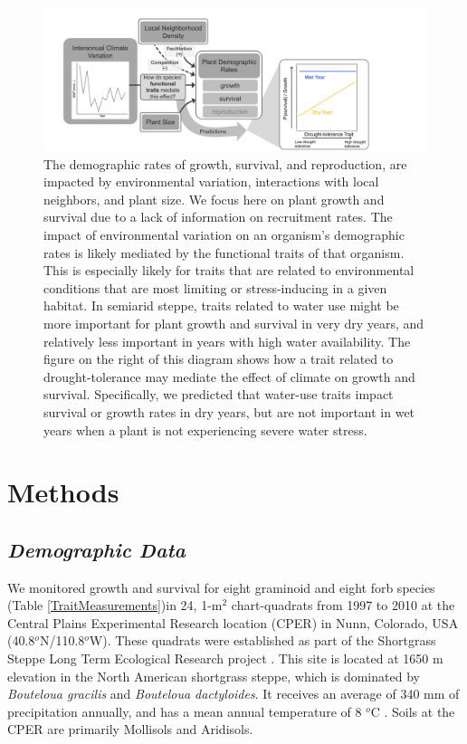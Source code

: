 \documentclass[12pt, letterpaper]{article}
\begin{document}
\begin{figure}
\includegraphics[width=1\textwidth]{CO_sgs_ConceptualFigure.pdf}
\caption{\small{
The demographic rates of growth, survival, and reproduction, are impacted by environmental variation, interactions with local neighbors, and plant size. We focus here on plant growth and survival due to a lack of information on recruitment rates. The impact of environmental variation on an organism's demographic rates is likely mediated by the functional traits of that organism. This is especially likely for traits that are related to environmental conditions that are most limiting or stress-inducing in a given habitat. In semiarid steppe, traits related to water use might be more important for plant growth and survival in very dry years, and relatively less important in years with high water availability. The figure on the right of this diagram shows how a trait related to drought-tolerance may mediate the effect of climate on growth and survival. Specifically, we predicted that water-use traits impact survival or growth rates in dry years, but are not important in wet years when a plant is not experiencing severe water stress. 
}}
\label{fig:ConceptFig}
\end{figure}

\section{Methods}
\subsection{\textit{Demographic Data}} We monitored growth and survival for eight graminoid and eight forb species (Table \ref{TraitMeasurements})in 24, 1-m$^2$ chart-quadrats from 1997 to 2010 at the Central Plains Experimental Research location (CPER) in Nunn, Colorado, USA (40.8$^o$N/110.8$^o$W). These quadrats were established as part of the Shortgrass Steppe Long Term Ecological Research project \citep{Chu2013}. This site is located at 1650 m elevation in the North American shortgrass steppe, which is dominated by \textit{Bouteloua gracilis} and \textit{Bouteloua dactyloides}. It receives an average of 340 mm of precipitation annually, and has a mean annual temperature of 8 $^o$C \citep{Chu2014}. Soils at the CPER are primarily Mollisols and Aridisols.
\end{document}
